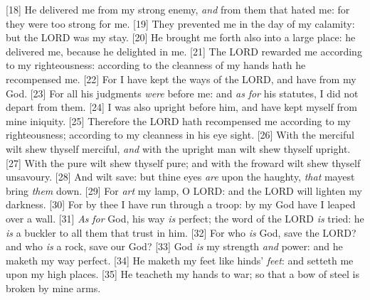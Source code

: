 [18] \textcolor[cmyk]{0.99998,1,0,0}{He delivered me from my strong enemy, \emph{and} from them that hated me: for they were too strong for me.}
[19] \textcolor[cmyk]{0.99998,1,0,0}{They prevented me in the day of my calamity: but the LORD was my stay.}
[20] \textcolor[cmyk]{0.99998,1,0,0}{He brought me forth also into a large place: he delivered me, because he delighted in me.}
[21] \textcolor[cmyk]{0.99998,1,0,0}{The LORD rewarded me according to my righteousness: according to the cleanness of my hands hath he recompensed me.}
[22] \textcolor[cmyk]{0.99998,1,0,0}{For I have kept the ways of the LORD, and have  from my God.}
[23] \textcolor[cmyk]{0.99998,1,0,0}{For all his judgments \emph{were} before me: and \emph{as} \emph{for} his statutes, I did not depart from them.}
[24] \textcolor[cmyk]{0.99998,1,0,0}{I was also upright before him, and have kept myself from mine iniquity.}
[25] \textcolor[cmyk]{0.99998,1,0,0}{Therefore the LORD hath recompensed me according to my righteousness; according to my cleanness in his eye sight.}
[26] \textcolor[cmyk]{0.99998,1,0,0}{With the merciful   wilt shew thyself merciful, \emph{and} with the upright man   wilt shew thyself upright.}
[27] \textcolor[cmyk]{0.99998,1,0,0}{With the pure   wilt shew thyself pure; and with the froward   wilt shew thyself unsavoury.}
[28] \textcolor[cmyk]{0.99998,1,0,0}{And    wilt save: but thine eyes \emph{are} upon the haughty, \emph{that}   mayest bring \emph{them} down.}
[29] \textcolor[cmyk]{0.99998,1,0,0}{For   \emph{art} my lamp, O LORD: and the LORD will lighten my darkness.}
[30] \textcolor[cmyk]{0.99998,1,0,0}{For by thee I have run through a troop: by my God have I leaped over a wall.}
[31] \textcolor[cmyk]{0.99998,1,0,0}{\emph{As} \emph{for} God, his way \emph{is} perfect; the word of the LORD \emph{is} tried: he \emph{is} a buckler to all them that trust in him.}
[32] \textcolor[cmyk]{0.99998,1,0,0}{For who \emph{is} God, save the LORD? and who \emph{is} a rock, save our God?}
[33] \textcolor[cmyk]{0.99998,1,0,0}{God \emph{is} my strength \emph{and} power: and he maketh my way perfect.}
[34] \textcolor[cmyk]{0.99998,1,0,0}{He maketh my feet like hinds' \emph{feet}: and setteth me upon my high places.}
[35] \textcolor[cmyk]{0.99998,1,0,0}{He teacheth my hands to war; so that a bow of steel is broken by mine arms.}
